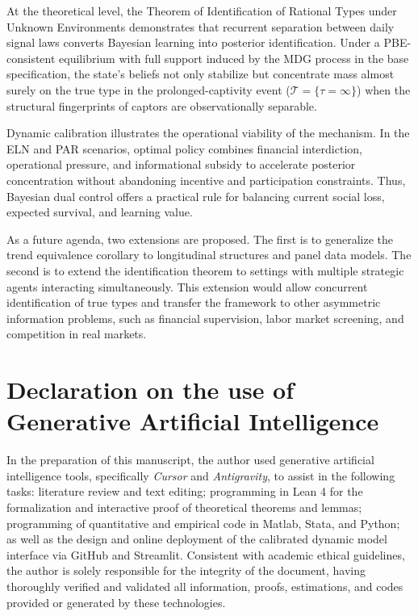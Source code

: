 \documentclass[ecta,nameyear,draft]{econsocart}
\theoremstyle{plain}
\theoremstyle{definition}
\newcommand{\1}{\mathbf{1}}
\begin{document}
At the theoretical level, the Theorem of Identification of Rational Types under Unknown Environments demonstrates that recurrent separation between daily signal laws converts Bayesian learning into posterior identification. Under a PBE-consistent equilibrium with full support induced by the MDG process in the base specification, the state's beliefs not only stabilize but concentrate mass almost surely on the true type in the prolonged-captivity event ($\mathcal{T}=\{\tau=\infty\}$) when the structural fingerprints of captors are observationally separable.

Dynamic calibration illustrates the operational viability of the mechanism. In the ELN and PAR scenarios, optimal policy combines financial interdiction, operational pressure, and informational subsidy to accelerate posterior concentration without abandoning incentive and participation constraints. Thus, Bayesian dual control offers a practical rule for balancing current social loss, expected survival, and learning value.

As a future agenda, two extensions are proposed. The first is to generalize the trend equivalence corollary to longitudinal structures and panel data models. The second is to extend the identification theorem to settings with multiple strategic agents interacting simultaneously. This extension would allow concurrent identification of true types and transfer the framework to other asymmetric information problems, such as financial supervision, labor market screening, and competition in real markets.

\section*{Declaration on the use of Generative Artificial Intelligence}

In the preparation of this manuscript, the author used generative artificial intelligence tools, specifically \emph{Cursor} and \emph{Antigravity}, to assist in the following tasks: literature review and text editing; programming in Lean 4 for the formalization and interactive proof of theoretical theorems and lemmas; programming of quantitative and empirical code in Matlab, Stata, and Python; as well as the design and online deployment of the calibrated dynamic model interface via GitHub and Streamlit. Consistent with academic ethical guidelines, the author is solely responsible for the integrity of the document, having thoroughly verified and validated all information, proofs, estimations, and codes provided or generated by these technologies.




\end{document}

